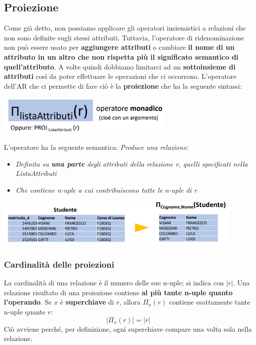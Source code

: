 \documentclass[12pt]{article}
\begin{document}
\subsection{Proiezione}
Come già detto, non possiamo applicare gli operatori insiemistici a relazioni che non sono definite sugli stessi attributi.
Tuttavia, l'operatore di ridenominazione non può essere usato per \textbf{aggiungere attributi} o cambiare \textbf{il nome di un attributo in un altro che non rispetta più il significato semantico di quell'attributo}.
A volte quindi dobbiamo limitarci ad un \textbf{sottoinsieme di attributi} così da poter effettuare le operazioni che ci occorrono.
L'operatore dell'AR che ci permette di fare ciò è la \textbf{proiezione} che ha la seguente sintassi:
\begin{center}
    \includegraphics[width =0.65\textwidth]{Images/131.PNG}
\end{center}
L'operatore ha la seguente semantica: \textit{Produce una relazione}:
\begin{itemize}
    \item \textit{Definita su \textbf{una parte} degli attributi della relazione r, quelli specificati nella ListaAttributi}
    \item \textit{Che contiene n-uple a cui contribuiscono tutte le n-uple di r}
\end{itemize}
\begin{center}
    \includegraphics[width =0.90\textwidth]{Images/132.PNG}
\end{center}
\subsubsection{Cardinalità delle proiezioni}
La cardinalità di una relazione è il numero delle sue n-uple; si indica con $|r|$.
Una relazione risultato di una proiezione contiene \textbf{al più tante n-uple quanto l'operando}.
Se $x$ è \textbf{superchiave} di $r$, allora $\Pi_x(r)$ contiene esattamente tante n-uple quante $r$:
$$|\Pi_x(r)| = |r|$$
Ciò avviene perché, per definizione, ogni superchiave compare una volta sola nella relazione.
\end{document}
